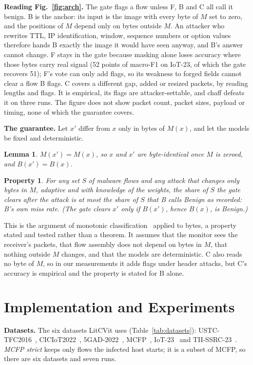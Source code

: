 \documentclass[journal]{IEEEtran}
\newtheorem{lemma}{Lemma}
\newtheorem{property}{Property}
\begin{document}
\textbf{Reading Fig.~\ref{fig:arch}.} The gate flags a flow unless F, B and C all call it benign. B is the anchor: its input is the image with every byte of $M$ set to zero, and the positions of $M$ depend only on bytes outside $M$. An attacker who rewrites TTL, IP identification, window, sequence numbers or option values therefore hands B exactly the image it would have seen anyway, and B's answer cannot change. F stays in the gate because masking alone loses accuracy where those bytes carry real signal (52 points of macro-F1 on IoT-23, of which the gate recovers 51); F's vote can only add flags, so its weakness to forged fields cannot clear a flow B flags. C covers a different gap, added or resized packets, by reading lengths and flags. It is empirical, its flags are attacker-settable, and chaff defeats it on three runs. The figure does not show packet count, packet sizes, payload or timing, none of which the guarantee covers.

\textbf{The guarantee.} Let $x'$ differ from $x$ only in bytes of $M(x)$, and let the models be fixed and deterministic.
\begin{lemma}
$M(x')=M(x)$, so $x$ and $x'$ are byte-identical once $M$ is zeroed, and $B(x')=B(x)$.
\end{lemma}
\begin{property}
For any set $S$ of malware flows and any attack that changes only bytes in $M$, adaptive and with knowledge of the weights, the share of $S$ the gate clears after the attack is at most the share of $S$ that B calls Benign as recorded: B's own miss rate. (The gate clears $x'$ only if $B(x')$, hence $B(x)$, is Benign.)
\end{property}
This is the argument of monotonic classification~\cite{incer2018monotonic} applied to bytes, a property stated and tested rather than a theorem. It assumes that the monitor sees the receiver's packets, that flow assembly does not depend on bytes in $M$, that nothing outside $M$ changes, and that the models are deterministic. C also reads no byte of $M$, so in our measurements it adds flags under header attacks, but C's accuracy is empirical and the property is stated for B alone.

\section{Implementation and Experiments}
\label{sec:setup}

\textbf{Datasets.} The six datasets LitCVit uses (Table~\ref{tab:datasets}): USTC-TFC2016~\cite{wang2017ustc}, CICIoT2022~\cite{dadkhah2022ciciot}, 5GAD-2022~\cite{coldwell2022fivegad}, MCFP~\cite{mcfp}, IoT-23~\cite{garcia2020iot23} and TII-SSRC-23~\cite{herzalla2023tii}. \emph{MCFP strict} keeps only flows the infected host starts; it is a subset of MCFP, so there are six datasets and seven runs.
\end{document}
